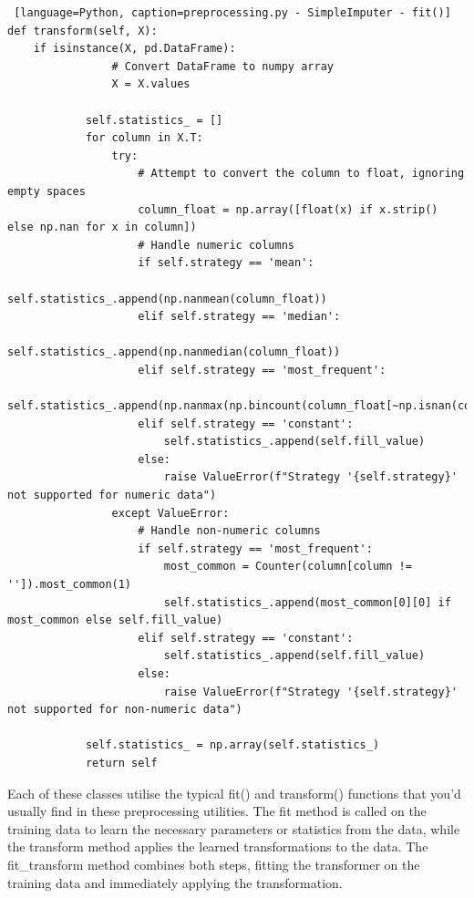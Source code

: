 \documentclass[letterpaper,10pt]{article}
\begin{document}
\begin{lstlisting} [language=Python, caption=preprocessing.py - SimpleImputer - fit()]
def transform(self, X):
    if isinstance(X, pd.DataFrame):
                # Convert DataFrame to numpy array
                X = X.values
    
            self.statistics_ = []
            for column in X.T:
                try:
                    # Attempt to convert the column to float, ignoring empty spaces
                    column_float = np.array([float(x) if x.strip() else np.nan for x in column])
                    # Handle numeric columns
                    if self.strategy == 'mean':
                        self.statistics_.append(np.nanmean(column_float))
                    elif self.strategy == 'median':
                        self.statistics_.append(np.nanmedian(column_float))
                    elif self.strategy == 'most_frequent':
                        self.statistics_.append(np.nanmax(np.bincount(column_float[~np.isnan(column_float)].astype(int))))
                    elif self.strategy == 'constant':
                        self.statistics_.append(self.fill_value)
                    else:
                        raise ValueError(f"Strategy '{self.strategy}' not supported for numeric data")
                except ValueError:
                    # Handle non-numeric columns
                    if self.strategy == 'most_frequent':
                        most_common = Counter(column[column != '']).most_common(1)
                        self.statistics_.append(most_common[0][0] if most_common else self.fill_value)
                    elif self.strategy == 'constant':
                        self.statistics_.append(self.fill_value)
                    else:
                        raise ValueError(f"Strategy '{self.strategy}' not supported for non-numeric data")
    
            self.statistics_ = np.array(self.statistics_)
            return self

\end{lstlisting}

Each of these classes utilise the typical fit() and transform() functions that you'd usually find in these preprocessing utilities. The fit method is called on the training data to learn the necessary parameters or statistics from the data, while the transform method applies the learned transformations to the data. The fit\_transform method combines both steps, fitting the transformer on the training data and immediately applying the transformation. \par
\end{document}
